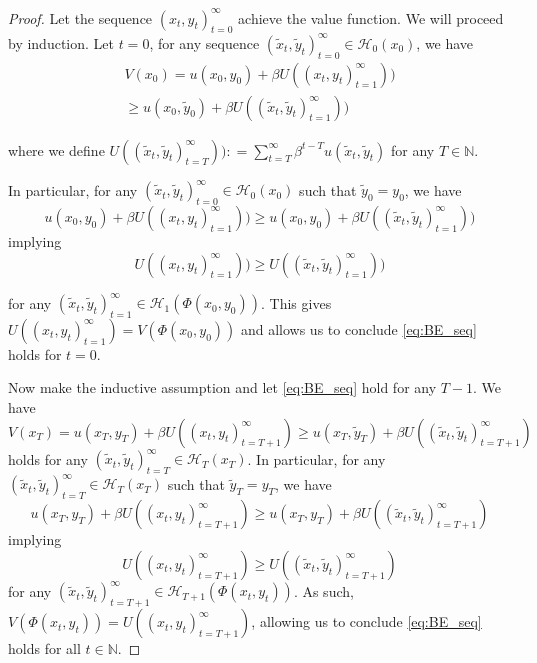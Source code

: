 \documentclass[12pt]{ectaart}
\newcommand{\1}{\mathbbm 1}
\theoremstyle{plain}
\theoremstyle{definition}
\begin{document}
\begin{proof}
	Let the sequence $(x_{t},y_{t})_{t=0}^{\infty}$ achieve the value function. We will proceed by induction. Let $t=0$, for any sequence $(\tilde{x}_{t}, \tilde{y}_{t})_{t=0}^{\infty}\in \mathcal{H}_{0}(x_{0})$, we have
	\begin{multline*}
	V(x_{0}) = u(x_{0}, y_{0}) + \beta U((x_{t},y_{t})_{t=1}^{\infty}))\\  \geq u(x_{0}, \tilde{y}_{0})  +  \beta U((\tilde{x}_{t},\tilde{y}_{t})_{t=1}^{\infty})) 
	\end{multline*}
	
	where  we define $U((\tilde{x}_{t},\tilde{y}_{t})_{t=T}^{\infty})) \colon =  \sum_{t=T}^{\infty}\beta^{t-T}u(\tilde{x}_{t},\tilde{y}_{t})$ for any $T\in \mathbb{N}$. 
	
	In particular, for any $(\tilde{x}_{t}, \tilde{y}_{t})_{t=0}^{\infty}\in \mathcal{H}_{0}(x_{0})$ such that $\tilde{y}_{0} = y_{0}$, we have
	\begin{equation*}
	u(x_{0}, y_{0}) + \beta U((x_{t},y_{t})_{t=1}^{\infty})) \geq u(x_{0}, y_{0})  +  \beta U((\tilde{x}_{t},\tilde{y}_{t})_{t=1}^{\infty})) 
	\end{equation*}
	implying 
	\begin{equation*}
	 U((x_{t},y_{t})_{t=1}^{\infty})) \geq   U((\tilde{x}_{t},\tilde{y}_{t})_{t=1}^{\infty})) 
	\end{equation*}
	
	for any $(\tilde{x}_{t},\tilde{y}_{t})_{t=1}^{\infty}\in \mathcal{H}_{1}(\Phi(x_{0},y_{0}))$. This gives $U((x_{t},y_{t})_{t=1}^{\infty}) = V(\Phi(x_{0},y_{0}))$ and allows us to conclude \eqref{eq:BE_seq} holds for $t=0$. 
	
	Now make the inductive assumption and let \eqref{eq:BE_seq} hold for any $T-1$. We have 
	\begin{equation*}
	V(x_{T}) = u(x_{T}, y_{T}) + \beta U((x_{t},y_{t})_{t=T+1}^{\infty}) \geq u(x_{T}, \tilde{y}_{T})  +  \beta U((\tilde{x}_{t},\tilde{y}_{t})_{t=T+1}^{\infty}) 
	\end{equation*}
	holds for any $(\tilde{x}_{t}, \tilde{y}_{t})_{t= T}^{\infty}\in \mathcal{H}_{T}(x_{T})$. In particular, for any $(\tilde{x}_{t}, \tilde{y}_{t})_{t=T}^{\infty}\in \mathcal{H}_{T}(x_{T})$ such that $\tilde{y}_{T} = y_{T}$, we have
	\begin{equation*}
	u(x_{T},y_{T}) + \beta U((x_{t},y_{t})_{t=T+1}^{\infty}) \geq u(x_{T}, y_{T}) + \beta U((\tilde{x}_{t},\tilde{y}_{t})_{t=T+1}^{\infty})
	\end{equation*}
	implying
	\begin{equation*}
		U((x_{t},y_{t})_{t=T+1}^{\infty}) \geq  U((\tilde{x}_{t},\tilde{y}_{t})_{t=T+1}^{\infty})
	\end{equation*}
	for any $(\tilde{x}_{t},\tilde{y}_{t})_{t=T+1}^{\infty} \in \mathcal{H}_{T+1}(\Phi(x_{t},y_{t}))$. As such, $V(\Phi(x_{t},y_{t})) = U((x_{t},y_{t})_{t=T+1}^{\infty})$, allowing us to conclude \eqref{eq:BE_seq} holds for all $t\in \mathbb{N}$. 
	

\end{proof}
\end{document}
